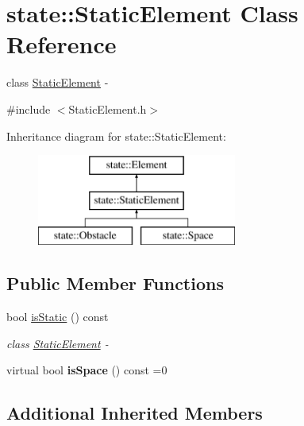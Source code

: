 \hypertarget{classstate_1_1_static_element}{}\section{state\+:\+:Static\+Element Class Reference}
\label{classstate_1_1_static_element}


class \hyperlink{classstate_1_1_static_element}{Static\+Element} -\/  




{\ttfamily \#include $<$Static\+Element.\+h$>$}

Inheritance diagram for state\+:\+:Static\+Element\+:\begin{figure}[H]
\begin{center}
\leavevmode
\includegraphics[height=3.000000cm]{classstate_1_1_static_element}
\end{center}
\end{figure}
\subsection*{Public Member Functions}
\begin{DoxyCompactItemize}
\item 
\mbox{\label{classstate_1_1_static_element_a2b96c76d0a9b0b9ef5b492cfc607cf57}} 
bool \hyperlink{classstate_1_1_static_element_a2b96c76d0a9b0b9ef5b492cfc607cf57}{is\+Static} () const
\begin{DoxyCompactList}\small\item\em class \hyperlink{classstate_1_1_static_element}{Static\+Element} -\/ \end{DoxyCompactList}\item 
\mbox{\label{classstate_1_1_static_element_a26612ed9b6442a92d4f8f4a6696db8ec}} 
virtual bool {\bfseries is\+Space} () const =0
\end{DoxyCompactItemize}
\subsection*{Additional Inherited Members}


